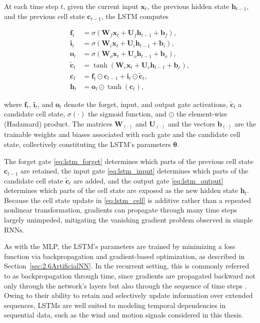 At each time step $t$, given the current input $\bm{x}_t$, the previous hidden state $\bm{h}_{t-1}$, and the previous cell state $\bm{c}_{t-1}$, the LSTM computes

\begin{align}
	\bm{f}_t &= \sigma\left(\bm{W}_f \bm{x}_t + \bm{U}_f \bm{h}_{t-1} + \bm{b}_f\right), \label{eq:lstm_forget} \\
	\bm{i}_t &= \sigma\left(\bm{W}_i \bm{x}_t + \bm{U}_i \bm{h}_{t-1} + \bm{b}_i\right), \label{eq:lstm_input} \\
	\bm{o}_t &= \sigma\left(\bm{W}_o \bm{x}_t + \bm{U}_o \bm{h}_{t-1} + \bm{b}_o\right), \label{eq:lstm_output} \\
	\tilde{\bm{c}}_t &= \tanh\left(\bm{W}_c \bm{x}_t + \bm{U}_c \bm{h}_{t-1} + \bm{b}_c\right), \label{eq:lstm_candidate} \\
	\bm{c}_t &= \bm{f}_t \odot \bm{c}_{t-1} + \bm{i}_t \odot \tilde{\bm{c}}_t, \label{eq:lstm_cell} \\
	\bm{h}_t &= \bm{o}_t \odot \tanh(\bm{c}_t), \label{eq:lstm_hidden}
\end{align}

where $\bm{f}_t$, $\bm{i}_t$, and $\bm{o}_t$ denote the forget, input, and output gate activations, $\tilde{\bm{c}}_t$ a candidate cell state, $\sigma(\cdot)$ the sigmoid function, and $\odot$ the element-wise (Hadamard) product. The matrices $\bm{W}_{(\cdot)}$ and $\bm{U}_{(\cdot)}$ and the vectors $\bm{b}_{(\cdot)}$ are the trainable weights and biases associated with each gate and the candidate cell state, collectively constituting the LSTM's parameters $\bm{\theta}$.

The forget gate \eqref{eq:lstm_forget} determines which parts of the previous cell state $\bm{c}_{t-1}$ are retained, the input gate \eqref{eq:lstm_input} determines which parts of the candidate cell state $\tilde{\bm{c}}_t$ are added, and the output gate \eqref{eq:lstm_output} determines which parts of the cell state are exposed as the new hidden state $\bm{h}_t$. Because the cell state update in \eqref{eq:lstm_cell} is additive rather than a repeated nonlinear transformation, gradients can propagate through many time steps largely unimpeded, mitigating the vanishing gradient problem observed in simple RNNs.

As with the MLP, the LSTM's parameters are trained by minimizing a loss function via backpropagation and gradient-based optimization, as described in Section~\ref{sec:2.6ArtificialNN}. In the recurrent setting, this is commonly referred to as backpropagation through time, since gradients are propagated backward not only through the network's layers but also through the sequence of time steps \cite{Werbos1990BPTT}. Owing to their ability to retain and selectively update information over extended sequences, LSTMs are well suited to modeling temporal dependencies in sequential data, such as the wind and motion signals considered in this thesis.
